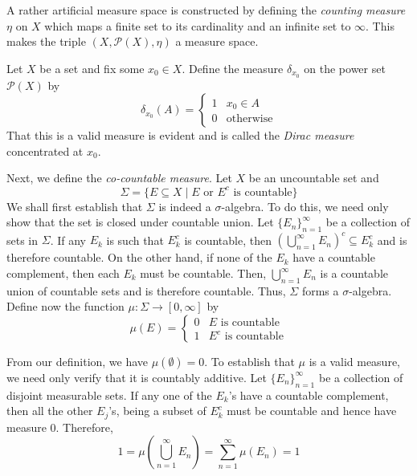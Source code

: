 A rather artificial measure space is constructed by defining the \textit{counting measure} $\eta$ on $X$ which maps a finite set to its cardinality and an infinite set to $\infty$. This makes the triple $(X,\mathcal P(X),\eta)$ a measure space. 

Let $X$ be a set and fix some $x_0\in X$. Define the measure $\delta_{x_0}$ on the power set $\mathcal P(X)$ by 
\begin{equation*}
    \delta_{x_0}(A) = 
    \begin{cases}
        1 & x_0\in A\\
        0 & \text{otherwise}
    \end{cases}
\end{equation*}
That this is a valid measure is evident and is called the \textit{Dirac measure} concentrated at $x_0$. 

Next, we define the \textit{co-countable measure}. Let $X$ be an uncountable set and 
\begin{equation*}
    \Sigma = \{E\subseteq X\mid E\text{ or }E^c\text{ is countable}\}
\end{equation*}
We shall first establish that $\Sigma$ is indeed a $\sigma$-algebra. To do this, we need only show that the set is closed under countable union. Let $\{E_n\}_{n = 1}^\infty$ be a collection of sets in $\Sigma$. If any $E_k$ is such that $E_k^c$ is countable, then $\left(\bigcup\limits_{n = 1}^\infty E_n\right)^c\subseteq E_k^c$ and is therefore countable. On the other hand, if none of the $E_k$ have a countable complement, then each $E_k$ must be countable. Then, $\bigcup\limits_{n = 1}^\infty E_n$ is a countable union of countable sets and is therefore countable. Thus, $\Sigma$ forms a $\sigma$-algebra. Define now the function $\mu:\Sigma\to[0,\infty]$ by 
\begin{equation*}
    \mu(E) = 
    \begin{cases}
        0 & E\text{ is countable}\\
        1 & E^c\text{ is countable}
    \end{cases}
\end{equation*}

From our definition, we have $\mu(\emptyset) = 0$. To establish that $\mu$ is a valid measure, we need only verify that it is countably additive. Let $\{E_n\}_{n = 1}^\infty$ be a collection of disjoint measurable sets. If any one of the $E_k$'s have a countable complement, then all the other $E_j$'s, being a subset of $E_k^c$ must be countable and hence have measure $0$. Therefore, 
\begin{equation*}
    1 = \mu\left(\bigcup_{n = 1}^\infty E_n\right) = \sum_{n = 1}^\infty\mu(E_n) = 1
\end{equation*}

